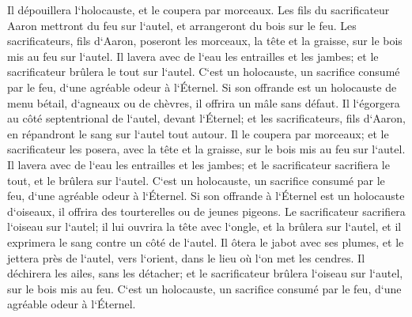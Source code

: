 \verse Il dépouillera l`holocauste, et le coupera par morceaux. 
\verse Les fils du sacrificateur Aaron mettront du feu sur l`autel, et arrangeront du bois sur le feu. 
\verse Les sacrificateurs, fils d`Aaron, poseront les morceaux, la tête et la graisse, sur le bois mis au feu sur l`autel. 
\verse Il lavera avec de l`eau les entrailles et les jambes; et le sacrificateur brûlera le tout sur l`autel. C`est un holocauste, un sacrifice consumé par le feu, d`une agréable odeur à l`Éternel. 
\verse Si son offrande est un holocauste de menu bétail, d`agneaux ou de chèvres, il offrira un mâle sans défaut. 
\verse Il l`égorgera au côté septentrional de l`autel, devant l`Éternel; et les sacrificateurs, fils d`Aaron, en répandront le sang sur l`autel tout autour. 
\verse Il le coupera par morceaux; et le sacrificateur les posera, avec la tête et la graisse, sur le bois mis au feu sur l`autel. 
\verse Il lavera avec de l`eau les entrailles et les jambes; et le sacrificateur sacrifiera le tout, et le brûlera sur l`autel. C`est un holocauste, un sacrifice consumé par le feu, d`une agréable odeur à l`Éternel. 
\verse Si son offrande à l`Éternel est un holocauste d`oiseaux, il offrira des tourterelles ou de jeunes pigeons. 
\verse Le sacrificateur sacrifiera l`oiseau sur l`autel; il lui ouvrira la tête avec l`ongle, et la brûlera sur l`autel, et il exprimera le sang contre un côté de l`autel. 
\verse Il ôtera le jabot avec ses plumes, et le jettera près de l`autel, vers l`orient, dans le lieu où l`on met les cendres. 
\verse Il déchirera les ailes, sans les détacher; et le sacrificateur brûlera l`oiseau sur l`autel, sur le bois mis au feu. C`est un holocauste, un sacrifice consumé par le feu, d`une agréable odeur à l`Éternel. 

